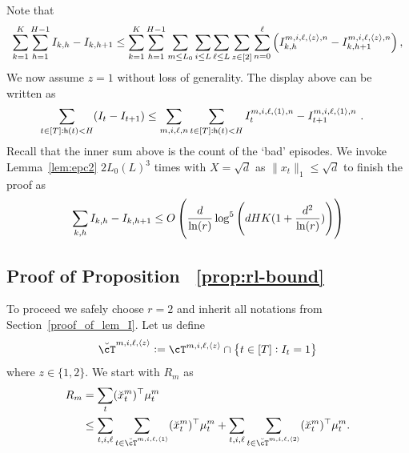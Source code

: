 Note that
\begin{align*}
\sum_{k=1}^K \sum_{h=1}^{H-1} I_{k,h} - I_{k,h+1}  \le \sum_{k=1}^K \sum_{h=1}^{H-1} \sum_{m \le L_0}\sum_{i \le L }\sum_{\ell \le L} \sum_{z\in[2]} \sum_{n =0}^{\ell} \del{I^{m,i,\ell,\la z\ra,n}_{k,h} - I^{m,i,\ell,\la z\ra,n}_{k,h+1} },
\end{align*}
We now assume $z=1$ without loss of generality.
The display above can be written as
\begin{align*}
    \sum_{t\in[T]: \mathsf{h}(t) < H}  (I_{t} - I_{t+1})
  &\le \sum_{m,i,\ell,n} \sum_{t\in[T]: \mathsf{h}(t) < H}  I^{m,i,\ell,{\langle}1{\rangle},n}_{t} - I^{m,i,\ell,{\langle}1{\rangle},n}_{t+1}~.
\end{align*}
Recall that the inner sum above is the count of the `bad' episodes.
We invoke Lemma~\ref{lem:epc2} $2L_0(L)^3$ times with $X=\sqrt{d}$ as $\|x_t\|_1\leq \sqrt{d}$  to finish the proof as 
 \begin{equation*}
    \sum_{k,h}I_{k,h}-I_{k,h+1}\le O\left(\frac{d}{\ln (r)}\log^5\left(dHK(1 + { \frac{d^2}{\ln (r) } }) \right)\right)
\end{equation*}

\subsection{Proof of Proposition ~\ref{prop:rl-bound}}\label{details}

To proceed we safely choose $r=2$ and inherit all notations from Section~\ref{proof_of_lem_I}. Let us define
\begin{align*}
  \blue{\brcT^{m,i,\ell,\la z\ra}} := \cT^{m,i,\ell,\la z\ra} \cap \cbr{t\in[T]:I_t = 1}  
\end{align*}
where $z \in \{1,2\}$.
We start with $R_m$ as 
\begin{align*}
  R_m &= \sum_{t}  (\brx_{t}^m)^\top \mu_{t}^m
  \\&\le \sum_{t,i,\ell} \sum_{t \in \brcT^{m,i,\ell,\la1\ra}}  (\brx_{t}^m)^\top \mu_{t}^m
  + \sum_{t,i,\ell} \sum_{t \in \brcT^{m,i,\ell,\la2\ra}} (\brx_{t}^m)^\top \mu_{t}^m.
\end{align*}


